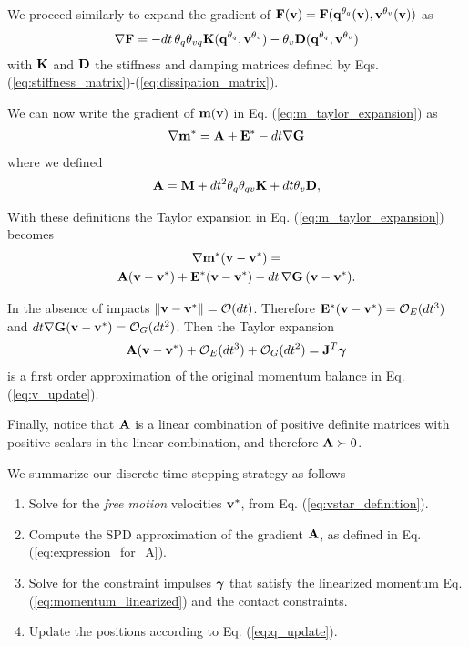 \begin{IEEEproof}
We proceed similarly to expand the gradient of ${\mathbf{F}}({\mathbf{v}})={\mathbf{F}}({\mathbf{q}}^{\theta_{q}}({\mathbf{v}}), {\mathbf{v}}^{\theta_v}({\mathbf{v}}))$ as
\begin{eqnarray}
	\nabla{\mathbf{F}} =
	-dt\,\theta_q\theta_{vq}{\mathbf{K}}({\mathbf{q}}^{\theta_q}, {\mathbf{v}}^{\theta_v})-\theta_v{\mathbf{D}}({\mathbf{q}}^{\theta_q}, {\mathbf{v}}^{\theta_v})
\end{eqnarray}
with ${\mathbf{K}}$ and ${\mathbf{D}}$ the stiffness and damping matrices defined by Eqs.
(\ref{eq:stiffness_matrix})-(\ref{eq:dissipation_matrix}).

We can now write the gradient of ${\mathbf{m}}({\mathbf{v}})$ in Eq. (\ref{eq:m_taylor_expansion}) as
\begin{eqnarray}
	\nabla{\mathbf{m}}^* = {\mathbf{A}} + {\mathbf{E}}^* - dt\nabla{\mathbf{G}}
\end{eqnarray}
where we defined
\begin{eqnarray}
	{\mathbf{A}}={\mathbf{M}}+ dt^2\theta_q\theta_{qv}{\mathbf{K}}+dt\theta_v{\mathbf{D}},
\end{eqnarray}

With these definitions the Taylor expansion in Eq. (\ref{eq:m_taylor_expansion})
becomes
\begin{multline}
	\nabla{\mathbf{m}}^*({\mathbf{v}}-{\mathbf{v}}^*) =\\
	{\mathbf{A}}({\mathbf{v}}-{\mathbf{v}}^*) + {\mathbf{E}}^*({\mathbf{v}}-{\mathbf{v}}^*) - dt\,\nabla{\mathbf{G}}\,({\mathbf{v}}-{\mathbf{v}}^*).
\end{multline}

In the absence of impacts $\Vert{\mathbf{v}}-{\mathbf{v}}^*\Vert=\mathcal{O}(dt)$. Therefore
${\mathbf{E}}^*({\mathbf{v}}-{\mathbf{v}}^*)=\mathcal{O}_E(dt^3)$ and
$dt\nabla{\mathbf{G}}({\mathbf{v}}-{\mathbf{v}}^*)=\mathcal{O}_G(dt^2)$. Then the Taylor expansion
\begin{eqnarray}
	{\mathbf{A}}({\mathbf{v}}-{\mathbf{v}}^*) + \mathcal{O}_E(dt^3) + \mathcal{O}_G(dt^2) = {\mathbf{J}}^T{\mathbf{{\bm\gamma}}}
\end{eqnarray}
is a first order approximation of the original momentum balance in Eq.
(\ref{eq:v_update}).

Finally, notice that ${\mathbf{A}}$ is a linear combination of positive definite
matrices with positive scalars in the linear combination, and therefore
${\mathbf{A}}\succ 0$.

\end{IEEEproof}

We summarize our discrete time stepping strategy as follows
\begin{enumerate}
	\item Solve for the \emph{free motion} velocities ${\mathbf{v}}^*$, from Eq.
	(\ref{eq:vstar_definition}).
	\item Compute the SPD approximation of the gradient ${\mathbf{A}}$, as defined in
	Eq. (\ref{eq:expression_for_A}).
	\item\label{it:solve_for_contact} Solve for the constraint impulses ${\bm\gamma}$ that satisfy the
	linearized momentum Eq. (\ref{eq:momentum_linearized}) and the contact
	constraints. 
	\item Update the positions according to Eq. (\ref{eq:q_update}).
\end{enumerate}

